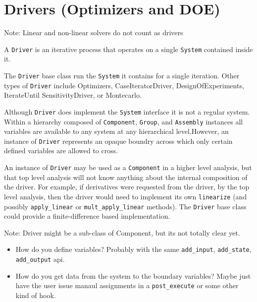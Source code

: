 \documentclass[12pt]{article}
\newcommand{\classname}[1]{\texttt{#1}}
\newcommand{\method}[1]{\texttt{#1}}
\begin{document}
\section{Drivers (Optimizers and DOE)}
Note: Linear and non-linear solvers do not count as drivers

A \classname{Driver} is an iterative process that operates on a single \classname{System} contained inside it.

The \classname{Driver} base class run the \classname{System} it contains for a single iteration.
Other types of \classname{Driver} include Optimizers, CaseIteratorDriver, DesignOfExperiments, IterateUntil
SensitivityDriver, or Montecarlo.

Although \classname{Driver} does implement the \classname{System} interface it is not a regular system.
Within a hierarchy composed of  \classname{Component}, \classname{Group}, and \classname{Assembly}
instances all variables are available to any system at any hierarchical level.However, an instance
of \classname{Driver} represents an opaque boundry across which only certain defined variables are allowed
to cross.

An instance of \classname{Driver} may be used as a \classname{Component} in a higher level analysis,
but that top level analysis will not know anything about the internal composition of the driver. For example,
if derivatives were requested from the driver, by the top level analysis, then the driver would need to
implement its own \method{linearize} (and possibly \method{apply\_linear} or \method{mult\_apply\_linear} methods).
The \classname{Driver} base class could provide a finite-difference based implementation.

Note: Driver might be a sub-class of Component, but its not totally clear yet.
\begin{itemize}
    \item How do you define variables? Probably with the same \method{add\_input}, \method{add\_state}, \method{add\_output} api.
    \item How do you get data from the system to the boundary variables? Maybe just have the user issue manaul assignments in
    a \method{post\_execute} or some other kind of hook.
\end{itemize}
\end{document}
